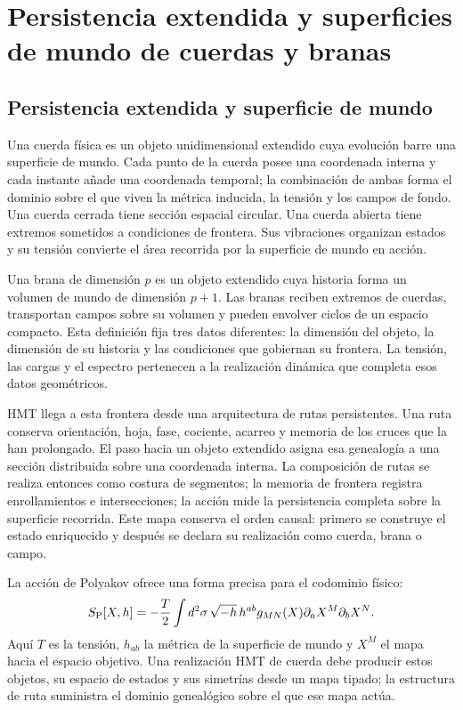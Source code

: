 \chapter{Persistencia extendida y superficies de mundo de cuerdas y branas}
\label{mdp4:chap:teoria-m}

\section{Persistencia extendida y superficie de mundo}

Una cuerda física es un objeto unidimensional extendido cuya evolución barre
una superficie de mundo. Cada punto de la cuerda posee una coordenada interna
y cada instante añade una coordenada temporal; la combinación de ambas forma
el dominio sobre el que viven la métrica inducida, la tensión y los campos de
fondo. Una cuerda cerrada tiene sección espacial circular. Una cuerda abierta
tiene extremos sometidos a condiciones de frontera. Sus vibraciones organizan
estados y su tensión convierte el área recorrida por la superficie de mundo en
acción.

Una brana de dimensión \(p\) es un objeto extendido cuya historia forma un
volumen de mundo de dimensión \(p+1\). Las branas reciben extremos de cuerdas,
transportan campos sobre su volumen y pueden envolver ciclos de un espacio
compacto. Esta definición fija tres datos diferentes: la dimensión del objeto,
la dimensión de su historia y las condiciones que gobiernan su frontera. La
tensión, las cargas y el espectro pertenecen a la realización dinámica que
completa esos datos geométricos.

HMT llega a esta frontera desde una arquitectura de rutas persistentes. Una
ruta conserva orientación, hoja, fase, cociente, acarreo y memoria de los
cruces que la han prolongado. El paso hacia un objeto extendido asigna esa
genealogía a una sección distribuida sobre una coordenada interna. La
composición de rutas se realiza entonces como costura de segmentos; la memoria
de frontera registra enrollamientos e intersecciones; la acción mide la
persistencia completa sobre la superficie recorrida. Este mapa conserva el
orden causal: primero se construye el estado enriquecido y después se declara
su realización como cuerda, brana o campo.

La acción de Polyakov ofrece una forma precisa para el codominio físico:
\[
 S_{\rm P}[X,h]
 =-\frac{T}{2}\int d^2\sigma\,
 \sqrt{-h}\,h^{ab}g_{MN}(X)
 \partial_aX^M\partial_bX^N.
\]
Aquí \(T\) es la tensión, \(h_{ab}\) la métrica de la superficie de mundo y
\(X^M\) el mapa hacia el espacio objetivo. Una realización HMT de cuerda debe
producir estos objetos, su espacio de estados y sus simetrías desde un mapa
tipado; la estructura de ruta suministra el dominio genealógico sobre el que
ese mapa actúa.

